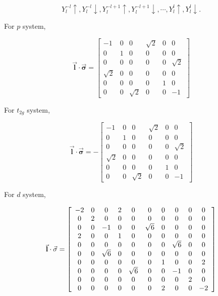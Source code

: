 \begin{equation}
Y_{l}^{-l}\uparrow,Y_{l}^{-l}\downarrow,Y_{l}^{-l+1}\uparrow,Y_{l}^{-l+1}\downarrow,\cdots,Y_{l}^{l}\uparrow,Y_{l}^{l}\downarrow.
\end{equation}


For $p$ system,

\begin{equation}
\vec{\mathbf{l}}\cdot\vec{\mathbf{\sigma}}=\left[\begin{array}{cccccc}
-1 & 0 & 0 & \sqrt{2} & 0 & 0\\
0 & 1 & 0 & 0 & 0 & 0\\
0 & 0 & 0 & 0 & 0 & \sqrt{2}\\
\sqrt{2} & 0 & 0 & 0 & 0 & 0\\
0 & 0 & 0 & 0 & 1 & 0\\
0 & 0 & \sqrt{2} & 0 & 0 & -1
\end{array}\right]
\end{equation}


For $t_{2g}$ system, 

\begin{equation}
\vec{\mathbf{l}}\cdot\vec{\mathbf{\sigma}}=-\left[\begin{array}{cccccc}
-1 & 0 & 0 & \sqrt{2} & 0 & 0\\
0 & 1 & 0 & 0 & 0 & 0\\
0 & 0 & 0 & 0 & 0 & \sqrt{2}\\
\sqrt{2} & 0 & 0 & 0 & 0 & 0\\
0 & 0 & 0 & 0 & 1 & 0\\
0 & 0 & \sqrt{2} & 0 & 0 & -1
\end{array}\right]
\end{equation}


For $d$ system,

\begin{equation}
\vec{\mathbf{l}}\cdot\vec{\mathbf{\sigma}}=\left[\begin{array}{cccccccccc}
-2 & 0 & 0 & 2 & 0 & 0 & 0 & 0 & 0 & 0\\
0 & 2 & 0 & 0 & 0 & 0 & 0 & 0 & 0 & 0\\
0 & 0 & -1 & 0 & 0 & \sqrt{6} & 0 & 0 & 0 & 0\\
2 & 0 & 0 & 1 & 0 & 0 & 0 & 0 & 0 & 0\\
0 & 0 & 0 & 0 & 0 & 0 & 0 & \sqrt{6} & 0 & 0\\
0 & 0 & \text{\ensuremath{\sqrt{6}}} & 0 & 0 & 0 & 0 & 0 & 0 & 0\\
0 & 0 & 0 & 0 & 0 & 0 & 1 & 0 & 0 & 2\\
0 & 0 & 0 & 0 & \sqrt{6} & 0 & 0 & -1 & 0 & 0\\
0 & 0 & 0 & 0 & 0 & 0 & 0 & 0 & 2 & 0\\
0 & 0 & 0 & 0 & 0 & 0 & 2 & 0 & 0 & -2
\end{array}\right]
\end{equation}


